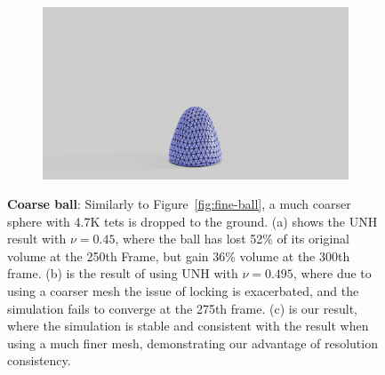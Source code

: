\begin{figure}[htp!]
\begin{subfigure}{.16\linewidth}
		\label{sfig:ball-vc-5}
	\end{subfigure}%
	\begin{subfigure}{.16\linewidth}
		\centering
		{\includegraphics[width=2.0\textwidth]{images/coarse_ball/vp/0450.jpg}}
		\label{sfig:ball-vc-6}
	\end{subfigure}\hfill
	\begin{subfigure}{.03\linewidth}
	\end{subfigure}%
	\begin{subfigure}{.16\linewidth}
	\end{subfigure}%
	\begin{subfigure}{.16\linewidth}
	\end{subfigure}%
	\begin{subfigure}{.16\linewidth}
	\end{subfigure}%
	\begin{subfigure}{.16\linewidth}
	\end{subfigure}%
	\begin{subfigure}{.16\linewidth}
	\end{subfigure}%
	\begin{subfigure}{.16\linewidth}
	\end{subfigure}%
	\caption{\textbf{Coarse ball}: Similarly to Figure~\ref{fig:fine-ball}, a much coarser sphere with 4.7K tets is dropped to the ground. (a) shows the UNH result  with $\nu = 0.45$, where the ball has lost 52\% of its original volume at the 250th Frame, but gain 36\% volume at the 300th frame. (b) is the result of using UNH with $\nu = 0.495$, where due to using a coarser mesh the issue of locking is exacerbated, and the simulation fails to converge at the 275th frame. (c) is our result, where the simulation is stable and consistent with the result when using a much finer mesh, demonstrating our advantage of resolution consistency. } \label{fig:coarse-ball}
\end{figure}

